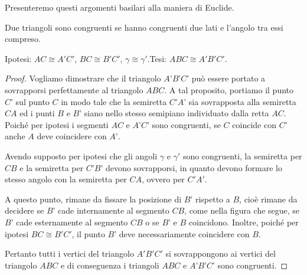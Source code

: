 Presenteremo questi argomenti basilari alla maniera di Euclide.

\begin{teorema}
Due triangoli sono congruenti se hanno congruenti due lati e l'angolo 
tra essi compreso.
\end{teorema}


\begin{inaccessibleblock}
 \begin{figure}[htb]
\centering
\end{figure}
\end{inaccessibleblock}

\noindent Ipotesi: $AC\cong A'C'$, $BC\cong B'C'$, $\gamma \cong 
\gamma'$.\tab Tesi:  $ABC \cong A'B'C'$.

\begin{proof}
Vogliamo dimostrare che il triangolo $A’B’C’$ può essere portato a 
sovrapporsi perfettamente al triangolo $ABC$.
A tal proposito, portiamo il punto $C’$ sul punto $C$ in modo tale 
che la semiretta $C’A’$ sia sovrapposta alla semiretta $CA$ ed i punti 
$B$ e $B’$ siano nello stesso semipiano individuato dalla retta $AC$.
Poiché per ipotesi i segmenti $AC$ e $A’C’$ sono congruenti, se $C$ 
coincide con $C’$ anche $A$ deve coincidere con $A’$.

Avendo supposto per ipotesi che gli angoli $\gamma$ e $\gamma'$ sono 
congruenti, la semiretta per $CB$ e la semiretta per $C’B’$ devono 
sovrapporsi, in quanto devono formare lo stesso angolo con la 
semiretta per $CA$, ovvero per $C'A'$.

A questo punto, rimane da fissare la posizione di $B’$ rispetto a 
$B$, cioè rimane da decidere se $B’$ cade internamente al segmento 
$CB$, come nella figura che segue, se $B’$ cade esternamente al 
segmento $CB$ o se $B’$ e $B$ coincidono.
Inoltre, poiché per ipotesi $BC\cong B'C'$, il punto $B’$ deve 
necessariamente coincidere con $B$.

Pertanto tutti i vertici del triangolo $A'B'C'$ si sovrappongono ai 
vertici del triangolo $ABC$ e di conseguenza i triangoli $ABC$ e 
$A’B’C’$ sono congruenti.
\end{proof}

